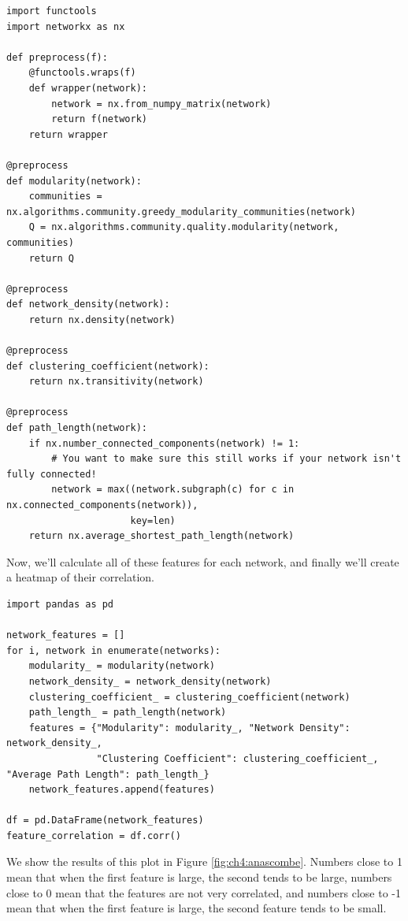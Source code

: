 \begin{lstlisting}[style=python]
import functools
import networkx as nx

def preprocess(f):
    @functools.wraps(f)
    def wrapper(network):
        network = nx.from_numpy_matrix(network)
        return f(network)
    return wrapper

@preprocess
def modularity(network):
    communities = nx.algorithms.community.greedy_modularity_communities(network)
    Q = nx.algorithms.community.quality.modularity(network, communities)
    return Q

@preprocess
def network_density(network):
    return nx.density(network)

@preprocess
def clustering_coefficient(network):
    return nx.transitivity(network)

@preprocess
def path_length(network):
    if nx.number_connected_components(network) != 1:
        # You want to make sure this still works if your network isn't fully connected!
        network = max((network.subgraph(c) for c in nx.connected_components(network)), 
                      key=len)
    return nx.average_shortest_path_length(network)
\end{lstlisting}

Now, we'll calculate all of these features for each network, and finally we'll create a heatmap of their correlation.

\begin{lstlisting}[style=python]
import pandas as pd

network_features = []
for i, network in enumerate(networks):
    modularity_ = modularity(network)
    network_density_ = network_density(network)
    clustering_coefficient_ = clustering_coefficient(network)
    path_length_ = path_length(network)
    features = {"Modularity": modularity_, "Network Density": network_density_, 
                "Clustering Coefficient": clustering_coefficient_, "Average Path Length": path_length_}
    network_features.append(features)
    
df = pd.DataFrame(network_features)
feature_correlation = df.corr()
\end{lstlisting}
We show the results of this plot in Figure \ref{fig:ch4:anascombe}. Numbers close to 1 mean that when the first feature is large, the second tends to be large, numbers close to 0 mean that the features are not very correlated, and numbers close to -1 mean that when the first feature is large, the second feature tends to be small. 

